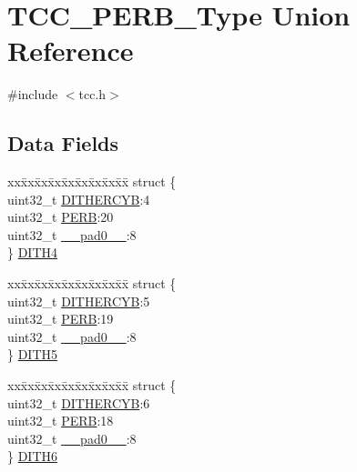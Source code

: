 \hypertarget{union_t_c_c___p_e_r_b___type}{}\section{T\+C\+C\+\_\+\+P\+E\+R\+B\+\_\+\+Type Union Reference}
\label{union_t_c_c___p_e_r_b___type}


{\ttfamily \#include $<$tcc.\+h$>$}

\subsection*{Data Fields}
\begin{DoxyCompactItemize}
\item 
\begin{tabbing}
xx\=xx\=xx\=xx\=xx\=xx\=xx\=xx\=xx\=\kill
struct \{\\
\>uint32\_t \mbox{\hyperlink{union_t_c_c___p_e_r_b___type_a156fbeb3ca1ed9f6622afd99724ad24c}{DITHERCYB}}:4\\
\>uint32\_t \mbox{\hyperlink{union_t_c_c___p_e_r_b___type_a097c0f751731b2d8c768978685a6c55f}{PERB}}:20\\
\>uint32\_t \mbox{\hyperlink{union_t_c_c___p_e_r_b___type_a3e57c2ef1c3ffb36722f000cc1156824}{\_\_pad0\_\_}}:8\\
\} \mbox{\hyperlink{union_t_c_c___p_e_r_b___type_a6721f593c221265edf86cc87258f9d7a}{DITH4}}\\

\end{tabbing}\item 
\begin{tabbing}
xx\=xx\=xx\=xx\=xx\=xx\=xx\=xx\=xx\=\kill
struct \{\\
\>uint32\_t \mbox{\hyperlink{union_t_c_c___p_e_r_b___type_a156fbeb3ca1ed9f6622afd99724ad24c}{DITHERCYB}}:5\\
\>uint32\_t \mbox{\hyperlink{union_t_c_c___p_e_r_b___type_a097c0f751731b2d8c768978685a6c55f}{PERB}}:19\\
\>uint32\_t \mbox{\hyperlink{union_t_c_c___p_e_r_b___type_a3e57c2ef1c3ffb36722f000cc1156824}{\_\_pad0\_\_}}:8\\
\} \mbox{\hyperlink{union_t_c_c___p_e_r_b___type_ac0835c6eb5b8098cc74a358c91b201ad}{DITH5}}\\

\end{tabbing}\item 
\begin{tabbing}
xx\=xx\=xx\=xx\=xx\=xx\=xx\=xx\=xx\=\kill
struct \{\\
\>uint32\_t \mbox{\hyperlink{union_t_c_c___p_e_r_b___type_a156fbeb3ca1ed9f6622afd99724ad24c}{DITHERCYB}}:6\\
\>uint32\_t \mbox{\hyperlink{union_t_c_c___p_e_r_b___type_a097c0f751731b2d8c768978685a6c55f}{PERB}}:18\\
\>uint32\_t \mbox{\hyperlink{union_t_c_c___p_e_r_b___type_a3e57c2ef1c3ffb36722f000cc1156824}{\_\_pad0\_\_}}:8\\
\} \mbox{\hyperlink{union_t_c_c___p_e_r_b___type_a1887c02faeddf212b233f6c4ed8b961e}{DITH6}}\\


\end{tabbing}
\end{DoxyCompactItemize}
